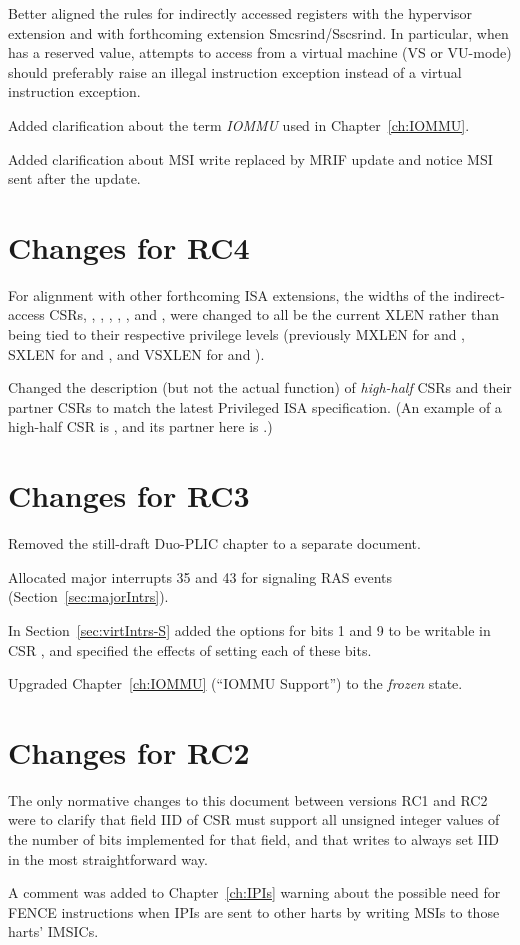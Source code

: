 Better aligned the rules for indirectly accessed registers with the
hypervisor extension and with forthcoming extension Smcsrind/Sscsrind.
In particular, when  has a reserved value, attempts
to access  from a virtual machine (VS or \mbox{VU-mode})
should preferably raise an illegal instruction exception
instead of a virtual instruction exception.

Added clarification about the term \emph{\mbox{IOMMU}}
used in Chapter~\ref{ch:IOMMU}.

Added clarification about MSI write replaced by MRIF update and
notice MSI sent after the update.

\section*{Changes for RC4}

For alignment with other forthcoming {\RISCV} ISA extensions,
the widths of the indirect-access CSRs, , ,
, , , and , were
changed to all be the current XLEN rather than being tied to
their respective privilege levels (previously MXLEN for
 and , SXLEN for  and ,
and VSXLEN for  and ).

Changed the description (but not the actual function)
of \emph{high-half} CSRs and their partner CSRs
to match the latest {\RISCV} Privileged ISA specification.
(An example of a high-half CSR is ,
and its partner here is .)

\section*{Changes for RC3}

Removed the still-draft Duo-PLIC chapter to a separate document.

Allocated major interrupts 35 and 43 for signaling RAS events
(Section~\ref{sec:majorIntrs}).

In Section~\ref{sec:virtIntrs-S} added the options
for bits 1 and 9 to be writable in CSR ,
and specified the effects of setting each of these bits.

Upgraded Chapter~\ref{ch:IOMMU} (``IOMMU Support'')
to the \emph{frozen} state.

\section*{Changes for RC2}

The only normative changes to this document
between versions RC1 and RC2 were to clarify that
field IID of CSR  must support all
unsigned integer values of the number of bits implemented
for that field, and that writes to 
always set IID in the most straightforward way.

A comment was added to Chapter~\ref{ch:IPIs} warning about
the possible need for FENCE instructions when IPIs are
sent to other harts by writing MSIs to those harts' IMSICs.

